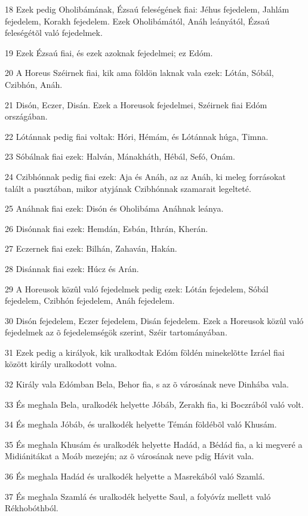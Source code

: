\par 18 Ezek pedig Oholibámának, Ézsaú feleségének fiai: Jéhus fejedelem, Jahlám fejedelem, Korakh fejedelem. Ezek Oholibámától, Anáh leányától, Ézsaú feleségétõl való fejedelmek.
\par 19 Ezek Ézsaú fiai, és ezek azoknak fejedelmei; ez Edóm.
\par 20 A Horeus Széirnek fiai, kik ama földön laknak vala ezek: Lótán, Sóbál, Czibhón, Anáh.
\par 21 Disón, Eczer, Disán. Ezek a Horeusok fejedelmei, Széirnek fiai Edóm országában.
\par 22 Lótánnak pedig fiai voltak: Hóri, Hémám, és Lótánnak húga, Timna.
\par 23 Sóbálnak fiai ezek: Halván, Mánakháth, Hébál, Sefó, Onám.
\par 24 Czibhónnak pedig fiai ezek: Aja és Anáh, az az Anáh, ki meleg forrásokat talált a pusztában, mikor atyjának Czibhónnak szamarait legelteté.
\par 25 Anáhnak fiai ezek: Disón és Oholibáma Anáhnak leánya.
\par 26 Disónnak fiai ezek: Hemdán, Esbán, Ithrán, Kherán.
\par 27 Eczernek fiai ezek: Bilhán, Zahaván, Hakán.
\par 28 Disánnak fiai ezek: Húcz és Arán.
\par 29 A Horeusok közûl való fejedelmek pedig ezek: Lótán fejedelem, Sóbál fejedelem, Czibhón fejedelem, Anáh fejedelem.
\par 30 Disón fejedelem, Eczer fejedelem, Disán fejedelem. Ezek a Horeusok közûl való fejedelmek az õ fejedelemségök szerint, Széir tartományában.
\par 31 Ezek pedig a királyok, kik uralkodtak Edóm földén minekelõtte Izráel fiai között király uralkodott volna.
\par 32 Király vala Edómban Bela, Behor fia, s az õ városának neve Dinhába vala.
\par 33 És meghala Bela, uralkodék helyette Jóbáb, Zerakh fia, ki Boczrából való volt.
\par 34 És meghala Jóbáb, és uralkodék helyette Témán földébõl való Khusám.
\par 35 És meghala Khusám és uralkodék helyette Hadád, a Bédád fia, a ki megveré a Midiánitákat a Moáb mezején; az õ városának neve pdig Hávit vala.
\par 36 És meghala Hadád és uralkodék helyette a Masrekából való Szamlá.
\par 37 És meghala Szamlá és uralkodék helyette Saul, a folyóvíz mellett való Rékhobóthból.
